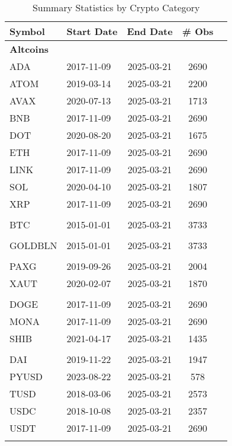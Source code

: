 \begin{table}[ht]
\centering
\scriptsize
\setlength{\tabcolsep}{4pt}
\begin{tabular}{llccc}
\toprule
Symbol & Start Date & End Date & \# Obs \\
\midrule
\multicolumn{4}{l}{\textbf{Altcoins}} \\
ADA & 2017-11-09 & 2025-03-21 & 2690 \\
ATOM & 2019-03-14 & 2025-03-21 & 2200 \\
AVAX & 2020-07-13 & 2025-03-21 & 1713 \\
BNB & 2017-11-09 & 2025-03-21 & 2690 \\
DOT & 2020-08-20 & 2025-03-21 & 1675 \\
ETH & 2017-11-09 & 2025-03-21 & 2690 \\
LINK & 2017-11-09 & 2025-03-21 & 2690 \\
SOL & 2020-04-10 & 2025-03-21 & 1807 \\
XRP & 2017-11-09 & 2025-03-21 & 2690 \\
\addlinespace
\multicolumn{4}{l}{\textbf{Bitcoin}} \\
BTC & 2015-01-01 & 2025-03-21 & 3733 \\
\addlinespace
\multicolumn{4}{l}{\textbf{Gold}} \\
GOLDBLN & 2015-01-01 & 2025-03-21 & 3733 \\
\addlinespace
\multicolumn{4}{l}{\textbf{Gold Pegged}} \\
PAXG & 2019-09-26 & 2025-03-21 & 2004 \\
XAUT & 2020-02-07 & 2025-03-21 & 1870 \\
\addlinespace
\multicolumn{4}{l}{\textbf{Meme Coins}} \\
DOGE & 2017-11-09 & 2025-03-21 & 2690 \\
MONA & 2017-11-09 & 2025-03-21 & 2690 \\
SHIB & 2021-04-17 & 2025-03-21 & 1435 \\
\addlinespace
\multicolumn{4}{l}{\textbf{Stablecoins}} \\
DAI & 2019-11-22 & 2025-03-21 & 1947 \\
PYUSD & 2023-08-22 & 2025-03-21 & 578 \\
TUSD & 2018-03-06 & 2025-03-21 & 2573 \\
USDC & 2018-10-08 & 2025-03-21 & 2357 \\
USDT & 2017-11-09 & 2025-03-21 & 2690 \\
\addlinespace
\bottomrule
\end{tabular}
\caption{Summary Statistics by Crypto Category}
\label{tab:symbol_summary_table}
\end{table}
